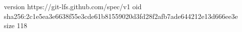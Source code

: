 version https://git-lfs.github.com/spec/v1
oid sha256:2c1e5ea3e6638f55e3cde61b81559020d3fd28f2afb7ade644212e13d666ee3e
size 118

